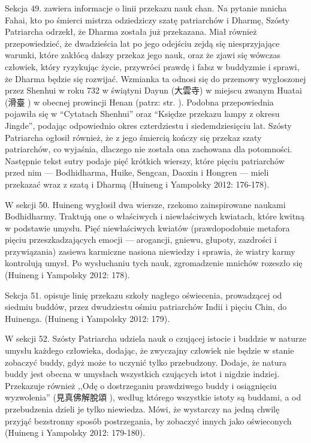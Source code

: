 Sekcja 49. zawiera informacje o linii przekazu nauk chan.
Na pytanie mnicha Fahai, kto po śmierci mistrza odziedziczy szatę patriarchów i Dharmę, Szósty Patriarcha odrzekł, że Dharma została już przekazana.
Miał również przepowiedzieć, że dwadzieścia lat po jego odejściu zejdą się niesprzyjające warunki, które zakłócą dalszy przekaz jego nauk, oraz że zjawi się wówczas człowiek, który ryzykując życie, przywróci prawdę i fałsz w buddyzmie i sprawi, że Dharma będzie się rozwijać.
Wzmianka ta odnosi się do przemowy wygłoszonej przez Shenhui w roku 732 w świątyni Dayun (大雲寺) w miejscu zwanym Huatai (滑臺 ) w obecnej prowincji Henan (patrz: str. \pageref{Huatai}).
Podobna przepowiednia pojawiła się w ``Cytatach Shenhui'' oraz ``Księdze przekazu lampy z okresu Jingde'', podając odpowiednio okres czterdziestu i siedemdziesięciu lat.
Szósty Patriarcha ogłosił również, że z jego śmiercią kończy się przekaz szaty patriarchów, co wyjaśnia, dlaczego nie została ona zachowana dla potomności.
Następnie tekst sutry podaje pięć krótkich wierszy, które pięciu patriarchów przed nim --- Bodhidharma, Huike, Sengcan, Daoxin i Hongren --- mieli przekazać wraz z szatą i Dharmą
(Huineng i Yampolsky 2012: 176-178).

W sekcji 50. Huineng wygłosił dwa wiersze, rzekomo zainspirowane naukami Bodhidharmy.
Traktują one o właściwych i niewłaściwych kwiatach, które kwitną w podstawie umysłu.
Pięć niewłaściwych kwiatów (prawdopodobnie metafora pięciu przeszkadzających emocji --- arogancji, gniewu, głupoty, zazdrości i przywiązania) zasiewa karmiczne nasiona niewiedzy i sprawia, że wiatry karmy kontrolują umysł.
Po wysłuchaniu tych nauk, zgromadzenie mnichów rozeszło się
(Huineng i Yampolsky 2012: 178).

Sekcja 51. opisuje linię przekazu szkoły nagłego oświecenia, prowadzącej od siedmiu buddów, przez dwudziestu ośmiu patriarchów Indii i pięciu Chin, do Huinenga.
(Huineng i Yampolsky 2012: 179).

W sekcji 52. Szósty Patriarcha udziela nauk o czującej istocie i buddzie w naturze umysłu każdego człowieka, dodając, że zwyczajny człowiek nie będzie w stanie zobaczyć buddy, gdyż może to uczynić tylko przebudzony.
Dodaje, że natura buddy jest obecna w umysłach wszystkich czujących istot i nigdzie indziej.
Przekazuje również ,,Odę o dostrzeganiu prawdziwego buddy i osiągnięciu wyzwolenia'' (見真佛解脫頌 ), według którego wszystkie istoty są buddami, a od przebudzenia dzieli je tylko niewiedza.
Mówi, że wystarczy na jedną chwilę przyjąć bezstronny sposób postrzegania, by zobaczyć innych jako oświeconych
(Huineng i Yampolsky 2012: 179-180).

